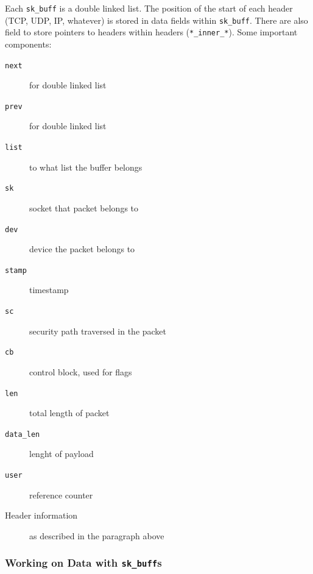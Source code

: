 \documentclass[english]{panikzettel}
\begin{document}
	Each \texttt{sk\_buff} is a double linked list.
	The position of the start of each header (TCP, UDP, IP, whatever) is stored in data fields within \texttt{sk\_buff}.
	There are also field to store pointers to headers within headers (\texttt{*\_inner\_*}).
	Some important components:
	\begin{description}
		\item[\texttt{next}] for double linked list
		\item[\texttt{prev}] for double linked list
		\item[\texttt{list}] to what list the buffer belongs
		\item[\texttt{sk}] socket that packet belongs to
		\item[\texttt{dev}] device the packet belongs to
		\item[\texttt{stamp}] timestamp
		\item[\texttt{sc}] security path traversed in the packet
		\item[\texttt{cb}] control block, used for flags
		\item[\texttt{len}] total length of packet
		\item[\texttt{data\_len}] lenght of payload
		\item[\texttt{user}] reference counter
		\item[Header information] as described in the paragraph above
	\end{description}
	
	\subsubsection{Working on Data with \texttt{sk\_buff}s}
	\label{sss-working-on-data-with-sk_buffs}
	
\end{document}

